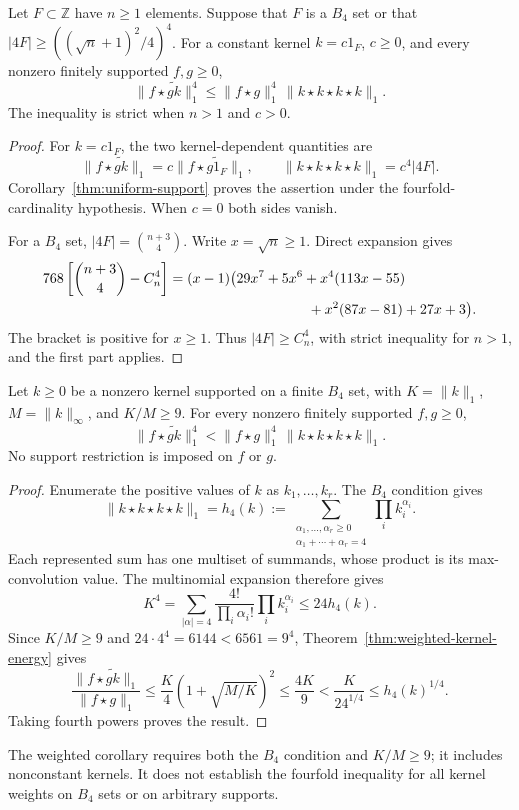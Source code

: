 \begin{corollary}\label{cor:b4-kernels}
Let $F\subset\mathbb Z$ have $n\ge1$ elements. Suppose that $F$ is a
$B_4$ set or that $|4F|\ge((\sqrt n+1)^2/4)^4$.
For a constant kernel $k=c1_F$, $c\ge0$, and
every nonzero finitely supported $f,g\ge0$,
\[
 \|f\star\widetilde{gk}\|_1^4
 \le\|f\star g\|_1^4\,\|k\star k\star k\star k\|_1.
\]
The inequality is strict when $n>1$ and $c>0$.
\end{corollary}
\begin{proof}
For $k=c1_F$, the two kernel-dependent quantities are
\[
 \|f\star\widetilde{gk}\|_1
   =c\|f\star\widetilde{g1_F}\|_1,
 \qquad
 \|k\star k\star k\star k\|_1=c^4|4F|.
\]
Corollary~\ref{thm:uniform-support} proves the assertion under the
fourfold-cardinality hypothesis. When $c=0$ both sides vanish.

For a $B_4$ set, $|4F|=\binom{n+3}{4}$. Write $x=\sqrt n\ge1$.
Direct expansion gives
\begin{equation}\label{eq:b4-cardinality}
 \begin{aligned}
 768\left[\binom{n+3}{4}-C_n^4\right]
  &=(x-1)\bigl(29x^7+5x^6+x^4(113x-55)\\
  &\hspace{35mm}{}+x^2(87x-81)+27x+3\bigr).
 \end{aligned}
\end{equation}
The bracket is positive for $x\ge1$. Thus $|4F|\ge C_n^4$, with
strict inequality for $n>1$, and the first part applies.
\end{proof}

\begin{corollary}\label{cor:b4-weighted-energy}
Let $k\ge0$ be a nonzero kernel supported on a finite $B_4$ set, with
$K=\|k\|_1$, $M=\|k\|_\infty$, and $K/M\ge9$.
For every nonzero finitely supported $f,g\ge0$,
\[
 \|f\star\widetilde{gk}\|_1^4
 <\|f\star g\|_1^4\,\|k\star k\star k\star k\|_1.
\]
No support restriction is imposed on $f$ or $g$.
\end{corollary}
\begin{proof}
Enumerate the positive values of $k$ as $k_1,\ldots,k_r$.
The $B_4$ condition gives
\[
 \|k\star k\star k\star k\|_1
 =h_4(k):=\sum_{\substack{\alpha_1,\ldots,\alpha_r\ge0\\
                         \alpha_1+\cdots+\alpha_r=4}}
                   \prod_i k_i^{\alpha_i}.
\]
Each represented sum has one multiset of summands, whose product is
its max-convolution value. The multinomial expansion therefore gives
\[
 K^4=\sum_{|\alpha|=4}\frac{4!}{\prod_i\alpha_i!}
                    \prod_i k_i^{\alpha_i}\le24h_4(k).
\]
Since $K/M\ge9$ and $24\cdot4^4=6144<6561=9^4$,
Theorem~\ref{thm:weighted-kernel-energy} gives
\[
 \frac{\|f\star\widetilde{gk}\|_1}{\|f\star g\|_1}
 \le\frac K4(1+\sqrt{M/K})^2
 \le\frac{4K}{9}<\frac{K}{24^{1/4}}\le h_4(k)^{1/4}.
\]
Taking fourth powers proves the result.
\end{proof}

The weighted corollary requires both the $B_4$ condition and $K/M\ge9$;
it includes nonconstant kernels. It does not establish the fourfold
inequality for all kernel weights on $B_4$ sets or on arbitrary supports.
